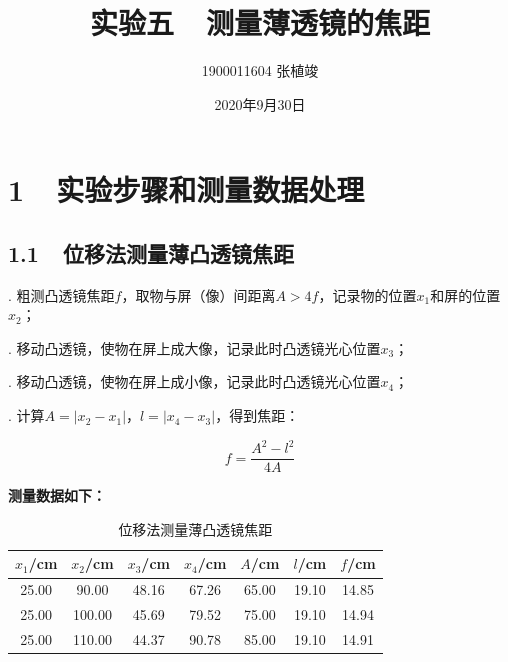 \documentclass{ctexbook}
\begin{document}
\Large

    \title{\textbf{实验五\ \ 测量薄透镜的焦距}}
    \author{\Large 1900011604 张植竣}
    \date{\Large 2020年9月30日}

    \maketitle

    \newpage
    \section*{ 1\ \ 实验步骤和测量数据处理}
    \bigskip

    \subsection*{ 1.1\ \ 位移法测量薄凸透镜焦距}

    . 粗测凸透镜焦距$f$，取物与屏（像）间距离$A > 4f$，记录物的位置$x_1$和屏的位置$x_2$；

    . 移动凸透镜，使物在屏上成大像，记录此时凸透镜光心位置$x_3$；

    . 移动凸透镜，使物在屏上成小像，记录此时凸透镜光心位置$x_4$；

    . 计算$A = |x_2-x_1|$，$l = |x_4-x_3|$，得到焦距：

    \[f = \frac{A^2 - l^2}{4A}\]

    \noindent \textbf{测量数据如下：}
    \begin{table}[ht!]
        \begin{center}
            \begin{tabular}{|c|c|c|c|c|c|c|}
                \hline
                $x_1$/cm & $x_2$/cm & $x_3$/cm & $x_4$/cm & $A$/cm & $l$/cm & $f$/cm \\
                \hline
                25.00 & 90.00 & 48.16 & 67.26 & 65.00 & 19.10 & 14.85 \\
                \hline
                25.00 & 100.00 & 45.69 & 79.52 & 75.00 & 19.10 & 14.94 \\
                \hline
                25.00 & 110.00 & 44.37 & 90.78 & 85.00 & 19.10 & 14.91 \\
                \hline
            \end{tabular}
            \caption{位移法测量薄凸透镜焦距}
        \end{center}
    \end{table}
\end{document}
